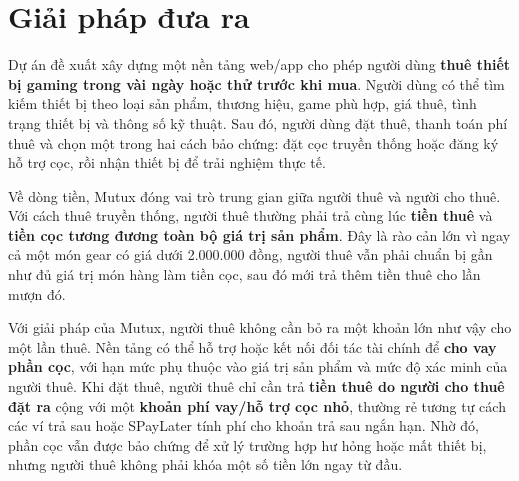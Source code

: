 \section{Giải pháp đưa ra}

Dự án đề xuất xây dựng một nền tảng web/app cho phép người dùng \textbf{thuê thiết bị gaming trong vài ngày hoặc thử trước khi mua}. Người dùng có thể tìm kiếm thiết bị theo loại sản phẩm, thương hiệu, game phù hợp, giá thuê, tình trạng thiết bị và thông số kỹ thuật. Sau đó, người dùng đặt thuê, thanh toán phí thuê và chọn một trong hai cách bảo chứng: đặt cọc truyền thống hoặc đăng ký hỗ trợ cọc, rồi nhận thiết bị để trải nghiệm thực tế.

Về dòng tiền, Mutux đóng vai trò trung gian giữa người thuê và người cho thuê. Với cách thuê truyền thống, người thuê thường phải trả cùng lúc \textbf{tiền thuê} và \textbf{tiền cọc tương đương toàn bộ giá trị sản phẩm}. Đây là rào cản lớn vì ngay cả một món gear có giá dưới 2.000.000 đồng, người thuê vẫn phải chuẩn bị gần như đủ giá trị món hàng làm tiền cọc, sau đó mới trả thêm tiền thuê cho lần mượn đó.

Với giải pháp của Mutux, người thuê không cần bỏ ra một khoản lớn như vậy cho một lần thuê. Nền tảng có thể hỗ trợ hoặc kết nối đối tác tài chính để \textbf{cho vay phần cọc}, với hạn mức phụ thuộc vào giá trị sản phẩm và mức độ xác minh của người thuê. Khi đặt thuê, người thuê chỉ cần trả \textbf{tiền thuê do người cho thuê đặt ra} cộng với một \textbf{khoản phí vay/hỗ trợ cọc nhỏ}, thường rẻ tương tự cách các ví trả sau hoặc SPayLater tính phí cho khoản trả sau ngắn hạn. Nhờ đó, phần cọc vẫn được bảo chứng để xử lý trường hợp hư hỏng hoặc mất thiết bị, nhưng người thuê không phải khóa một số tiền lớn ngay từ đầu.

